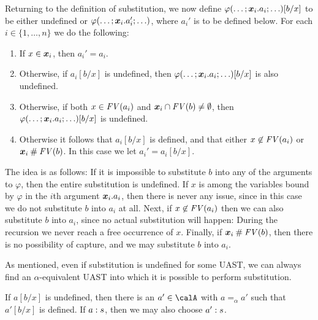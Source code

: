 \documentclass[a4paper, 11pt, article, danish, oneside]{memoir}
\DeclarePairedDelimiter{\auxdelimparen}{(}{)}
\newcommand*\intersect\cap
\renewcommand{\phi}{\varphi}
\newcommand{\freevar}[2][]{\mathit{FV}\auxdelimparen[#1]{#2}}
\begin{document}
Returning to the definition of substitution, we now define $\phi(\ldots ; \seq{x}_i.a_i ; \ldots)[b/x]$ to be either undefined or $\phi(\ldots ; \seq{x}_i.a_i' ; \ldots)$, where $a_i'$ is to be defined below. For each $i \in \{1, \ldots, n\}$ we do the following:
%
\begin{enumerate}
    \item If $x \in \bm{x}_i$, then $a_i' = a_i$.

    \item Otherwise, if $a_i[b/x]$ is undefined, then $\phi(\ldots ; \seq{x}_i.a_i ; \ldots)[b/x]$ is also undefined.

    \item Otherwise, if both $x \in \freevar{a_i}$ and $\seq{x}_i \intersect \freevar{b} \neq \emptyset$, then $\phi(\ldots ; \seq{x}_i.a_i ; \ldots)[b/x]$ is undefined.

    \item Otherwise it follows that $a_i[b/x]$ is defined, and that either $x \not\in \freevar{a_i}$ or $\seq{x}_i \disj \freevar{b}$. In this case we let $a_i' = a_i[b/x]$.
\end{enumerate}
%
The idea is as follows: If it is impossible to substitute $b$ into any of the arguments to $\phi$, then the entire substitution is undefined. If $x$ is among the variables bound by $\phi$ in the $i$th argument $\bm{x}_i.a_i$, then there is never any issue, since in this case we do not substitute $b$ into $a_i$ at all. Next, if $x \not\in \freevar{a_i}$ then we can also substitute $b$ into $a_i$, since no actual substitution will happen: During the recursion we never reach a free occurrence of $x$. Finally, if $\seq{x}_i \disj \freevar{b}$, then there is no possibility of capture, and we may substitute $b$ into $a_i$.

As mentioned, even if substitution is undefined for some UAST, we can always find an $\alpha$-equivalent UAST into which it is possible to perform substitution.

\begin{lemma}
    \label{lem:substitution-alpha-defined}
    If $a[b/x]$ is undefined, then there is an $a' \in \calA$ with $a =_\alpha a'$ such that $a'[b/x]$ is defined. If $a : s$, then we may also choose $a' : s$.
\end{lemma}
\end{document}
